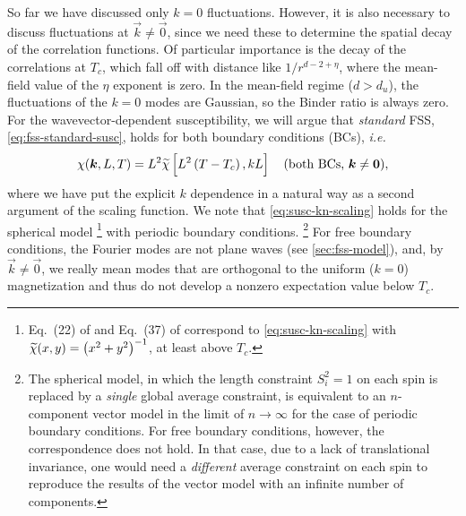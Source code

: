 So far we have discussed only $k=0$ fluctuations. However, it is also necessary
to discuss fluctuations at $\vec{k}\neq\vec{0}$, since we need these to
determine the spatial decay of the correlation functions.
Of particular importance is the decay of the correlations at $T_c$, which fall
off with distance like $1/r^{d-2+\eta}$, where the mean-field value of the
$\eta$ exponent is zero.
In the mean-field regime ($d>d_u$), the fluctuations of the $k=0$ modes are
Gaussian, so the Binder ratio is always zero.
For the wavevector-dependent susceptibility, we will argue that \emph{standard}
FSS, \cref{eq:fss-standard-susc}, holds for both boundary conditions (BCs),
\emph{i.e.}
\begin{equation}
  \chi(\bm{k},L,T) =
  L^2 \widetilde{\chi}\left[L^2 \left(T-T_c\right), kL\right]
  \quad\text{(both BCs, $\bm{k}\neq\bm{0}$)},
  \label{eq:susc-kn-scaling}
\end{equation}
where we have put the explicit $k$ dependence in a natural way as a second
argument of the scaling function. We note that \cref{eq:susc-kn-scaling} holds
for the spherical model%
\footnote{%
  Eq.~(22) of \textcite{shapiro1986fully} and Eq.~(37) of
  \textcite{brezin1982investigation} correspond to
  \cref{eq:susc-kn-scaling} with
  $\widetilde{\chi}(x,y)=\left(x^2+y^2\right)^{-1}$, at least above $T_c$.
}
with periodic boundary conditions.%
\footnote{%
  The spherical model, in which the length constraint $S_i^2=1$ on each spin is
  replaced by a \emph{single} global average constraint, is equivalent to an
  $n$-component vector model in the limit of $n\to\infty$ for the case of
  periodic boundary conditions. For free boundary conditions, however, the
  correspondence does not hold. In that case, due to a lack of translational
  invariance, one would need a \emph{different} average constraint on each spin
  to reproduce the results of the vector model with an infinite number of
  components.
}
For free boundary conditions, the Fourier modes are not plane waves (see
\cref{sec:fss-model}), and, by $\vec{k}\neq\vec{0}$, we really mean modes that
are orthogonal to the uniform ($k=0$) magnetization and thus do not develop a
nonzero expectation value below $T_c$.

